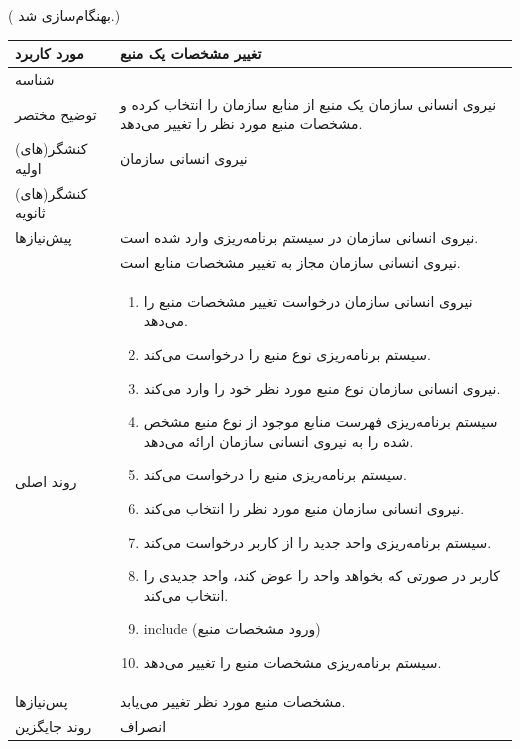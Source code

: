 ({\color{red} بهنگام‌سازی شد.})
\begin{table}[H]
	\centering
	\begin{tabular}{|p{3cm}|p{10cm}|}
		\hline
		
		مورد کاربرد	& تغییر مشخصات یک منبع  \\
		\hline
		
		شناسه & 
		\stepcounter{usecase_ID}
		
		\arabic{usecase_ID} \\
		
		\hline
		
		توضیح مختصر & نیروی انسانی سازمان یک منبع از منابع سازمان را انتخاب کرده و مشخصات منبع مورد نظر را تغییر می‌دهد. \\
		\hline
		
		کنشگر(های) اولیه& نیروی انسانی سازمان  \\
		\hline
		
		کنشگر(های) ثانویه&  \\
		\hline
		
		پیش‌نیازها &
		نیروی انسانی سازمان در سیستم برنامه‌ریزی وارد شده است.\\
		& نیروی انسانی سازمان مجاز به تغییر مشخصات منابع است. \\
		\hline
		
		
		روند اصلی &
		\begin{enumerate}[topsep=0cm,leftmargin=0.5cm]
			\item نیروی انسانی سازمان  درخواست تغییر مشخصات منبع را می‌دهد.
			\item سیستم برنامه‌ریزی نوع منبع را درخواست می‌کند.
			\item نیروی انسانی سازمان  نوع منبع مورد نظر خود را وارد می‌کند.
			\item سیستم برنامه‌ریزی فهرست منابع موجود از نوع منبع مشخص شده را به نیروی انسانی سازمان ارائه می‌دهد.
			\item سیستم برنامه‌ریزی منبع را درخواست می‌کند.
			\item نیروی انسانی سازمان منبع مورد نظر را انتخاب می‌کند.
			\item سیستم برنامه‌ریزی واحد جدید را از کاربر درخواست می‌کند.
			\item کاربر در صورتی که بخواهد واحد را عوض کند، واحد جدیدی را انتخاب می‌کند.
			\item include (ورود مشخصات منبع)
			\item سیستم برنامه‌ریزی مشخصات منبع را تغییر می‌دهد.
		\end{enumerate} \\
		\hline
		
		پس‌نیازها &
		مشخصات منبع مورد نظر تغییر می‌یابد. \\
		
		\hline
		روند جایگزین
		& انصراف \\
		\hline
		
	\end{tabular}
\end{table}


